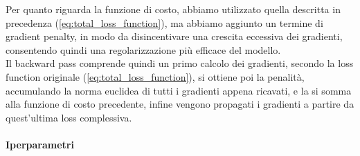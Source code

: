 \documentclass[a4paper,10pt,twocolumn]{article}
\begin{document}
Per quanto riguarda la funzione di costo, abbiamo utilizzato quella descritta in precedenza (\ref{eq:total_loss_function}), 
ma abbiamo aggiunto un termine di gradient penalty, in modo da disincentivare una crescita eccessiva dei gradienti, consentendo quindi una regolarizzazione più efficace del modello. \\
Il backward pass comprende quindi un primo calcolo dei gradienti, secondo la loss function originale (\ref{eq:total_loss_function}), si ottiene poi la penalità,
accumulando la norma euclidea di tutti i gradienti appena ricavati, e la si somma alla funzione di costo precedente, infine vengono propagati i gradienti a partire da quest'ultima loss complessiva.

\paragraph{Iperparametri}
\end{document}

